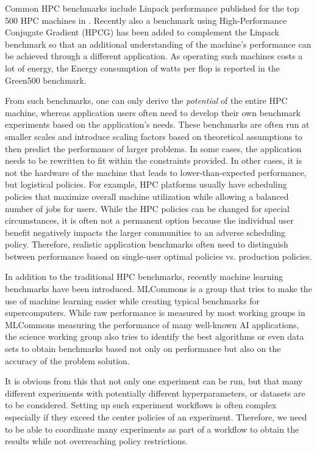 \documentclass[utf8]{FrontiersinVancouver} %
\begin{document}
Common HPC benchmarks include Linpack performance published for the top 500 HPC machines in \citep{www-top500}. Recently also a benchmark using High-Performance Conjugate Gradient (HPCG) has been added to complement the Linpack benchmark so that an additional understanding of the machine's performance can be achieved \citep{www-top500} through a different application.  As operating such machines costs a lot of energy, the Energy consumption of watts per flop is reported in the Green500 benchmark\citep{green500}.

From such benchmarks, one can only derive the {\em potential} of the entire HPC machine, whereas application users often need to develop their own benchmark experiments based on the application's needs. These benchmarks are often run at smaller scales and introduce scaling factors based on theoretical assumptions to then predict the performance of larger problems. In some cases, the application needs to be rewritten to fit within the constraints provided. In other cases, it is not the hardware of the machine that leads to lower-than-expected performance, but logistical policies. For example, HPC platforms usually have scheduling policies that maximize overall machine utilization while allowing a balanced number of jobs for users. While the HPC policies can be changed for special circumstances, it is often not a permanent option because the individual user benefit negatively impacts the larger communities to an adverse scheduling policy. Therefore, realistic application benchmarks often need to distinguish between performance based on single-user optimal policies vs. production policies.

In addition to the traditional HPC benchmarks, recently machine learning benchmarks have been introduced. MLCommons is a group that tries to make the use of machine learning easier while creating typical benchmarks for supercomputers. While raw performance is measured by most working groups in MLCommons measuring the performance of many well-known AI applications, the science working group also tries to identify the best algorithms or even data sets to obtain benchmarks based not only on performance but also on the accuracy of the problem solution.

It is obvious from this that not only one experiment can be run, but that many different experiments with potentially different hyperparameters, or datasets are to be considered. Setting up such experiment workflows is often complex especially if they exceed the center policies of an experiment. Therefore, we need to be able to coordinate many experiments as part of a workflow to obtain the results while not overreaching policy restrictions.
\end{document}
